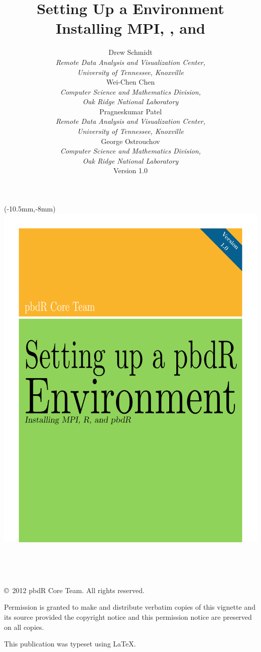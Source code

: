 \documentclass[a4paper,11pt]{article}
\title{}
\title{\Huge Setting Up a \proglang{pbdR} Environment\\[.3cm] 
  {\LARGE Installing MPI, \proglang{R}, and \proglang{pbdR}}}
\author{
\begin{minipage}{\textwidth}
\centering
%
%
Drew Schmidt\\
{\small\emph{Remote Data Analysis and Visualization Center,\\
University of Tennessee, Knoxville}}\\[.4cm]
Wei-Chen Chen\\
{\small\emph{Computer Science and Mathematics Division, \\
Oak Ridge National Laboratory}}\\[.4cm]
Pragneskumar Patel\\
{\small\emph{Remote Data Analysis and Visualization Center,\\
University of Tennessee, Knoxville}}\\[.4cm]
%
George Ostrouchov\\
{\small\emph{Computer Science and Mathematics Division, \\
Oak Ridge National Laboratory}}
\\[2.5in]
Version 1.0
%
\end{minipage}
}
\begin{document}
\prebodyheadfoot

\begin{textblock*}{0mm}(-10.5mm,-8mm)
\includegraphics[scale=1.07]{./_all/cover/cover_2}
\end{textblock*}

\newpage\ \newpage

\date{}
\maketitle

\ \vfill

\copyright\ 2012 pbdR Core Team.  All rights reserved.

Permission is granted to make and distribute verbatim copies of this vignette and its source provided the copyright notice and this permission notice are preserved on all copies.

This publication was typeset using \LaTeX.  


\newpage
{}
\fancyhf[R]{\thepage }
\fancyfoot{}
\tableofcontents


\newpage
{}
\setcounter{page}{1}
\pagestyle{fancy}

\bodyheadfoot





% 
% 

\end{document}
